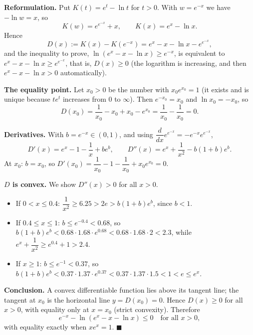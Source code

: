 \textbf{Reformulation.} Put $K(t)=e^t-\ln t$ for $t>0$. With $w=e^{-x}$ we have $-\ln w=x$, so
\[
K(w)=e^{e^{-x}}+x,\qquad K(x)=e^x-\ln x .
\]
Hence
\[
D(x):=K(x)-K(e^{-x})=e^x-x-\ln x-e^{e^{-x}},
\]
and the inequality to prove, $\ln(e^x-x-\ln x)\ge e^{-x}$, is equivalent to $e^x-x-\ln x\ge e^{e^{-x}}$, that is, $D(x)\ge0$ (the logarithm is increasing, and then $e^x-x-\ln x>0$ automatically).

\textbf{The equality point.} Let $x_0>0$ be the number with $x_0e^{x_0}=1$ (it exists and is unique because $te^t$ increases from $0$ to $\infty$). Then $e^{-x_0}=x_0$ and $\ln x_0=-x_0$, so
\[
D(x_0)=\dfrac{1}{x_0}-x_0+x_0-e^{x_0}=\dfrac{1}{x_0}-\dfrac{1}{x_0}=0 .
\]

\textbf{Derivatives.} With $b=e^{-x}\in(0,1)$, and using $\dfrac{d}{dx}e^{e^{-x}}=-e^{-x}e^{e^{-x}}$,
\[
D'(x)=e^x-1-\dfrac{1}{x}+be^{b},\qquad D''(x)=e^x+\dfrac{1}{x^2}-b(1+b)e^{b}.
\]
At $x_0$: $b=x_0$, so $D'(x_0)=\dfrac{1}{x_0}-1-\dfrac{1}{x_0}+x_0e^{x_0}=0$.

\textbf{$D$ is convex.} We show $D''(x)>0$ for all $x>0$.
\begin{itemize}
\item If $0<x\le0.4$: $\dfrac{1}{x^2}\ge6.25>2e>b(1+b)e^b$, since $b<1$.
\item If $0.4\le x\le1$: $b\le e^{-0.4}<0.68$, so $b(1+b)e^b<0.68\cdot1.68\cdot e^{0.68}<0.68\cdot1.68\cdot2<2.3$, while $e^x+\dfrac{1}{x^2}\ge e^{0.4}+1>2.4$.
\item If $x\ge1$: $b\le e^{-1}<0.37$, so $b(1+b)e^b<0.37\cdot1.37\cdot e^{0.37}<0.37\cdot1.37\cdot1.5<1<e\le e^x$.
\end{itemize}

\textbf{Conclusion.} A convex differentiable function lies above its tangent line; the tangent at $x_0$ is the horizontal line $y=D(x_0)=0$. Hence $D(x)\ge0$ for all $x>0$, with equality only at $x=x_0$ (strict convexity). Therefore
\[
e^{-x}-\ln\left(e^x-x-\ln x\right)\le0\quad\text{for all }x>0,
\]
with equality exactly when $xe^x=1$. $\blacksquare$
